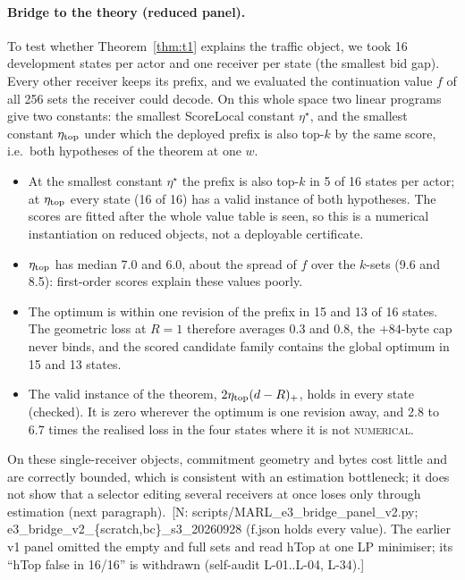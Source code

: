 \documentclass[11pt]{article}
\theoremstyle{definition}
\newcommand{\NUM}{\textsc{numerical}}
\newif\ifshownotes\shownotestrue
\newcommand{\NOTE}[1]{\ifshownotes{\color{notecol}\,\textsf{\footnotesize[N: #1]}}\fi}
\begin{document}
\paragraph{Bridge to the theory (reduced panel).} To test whether Theorem~\ref{thm:t1} explains the
traffic object, we took 16 development states per actor and one receiver per state (the smallest bid
gap). Every other receiver keeps its prefix, and we evaluated the continuation value $f$ of all 256
sets the receiver could decode. On this whole space two linear programs give two constants: the
smallest ScoreLocal constant $\eta^\star$, and the smallest constant $\eta_{\rm top}$ under which the
deployed prefix is also top-$k$ by the same score, i.e.\ both hypotheses of the theorem at one $w$.
\begin{itemize}
\item At the smallest constant $\eta^\star$ the prefix is also top-$k$ in 5 of 16 states per actor; at
  $\eta_{\rm top}$ every state (16 of 16) has a valid instance of both hypotheses. The scores are fitted
  after the whole value table is seen, so this is a numerical instantiation on reduced objects, not a
  deployable certificate.
\item $\eta_{\rm top}$ has median 7.0 and 6.0, about the spread of $f$ over the $k$-sets (9.6 and
  8.5): first-order scores explain these values poorly.
\item The optimum is within one revision of the prefix in 15 and 13 of 16 states. The geometric loss
  at $R=1$ therefore averages 0.3 and 0.8, the $+84$-byte cap never binds, and the scored candidate
  family contains the global optimum in 15 and 13 states.
\item The valid instance of the theorem, $2\eta_{\rm top}(d-R)_+$, holds in every state (checked). It
  is zero wherever the optimum is one revision away, and 2.8 to 6.7 times the realised loss in the four
  states where it is not \NUM.
\end{itemize}
On these single-receiver objects, commitment geometry and bytes cost little and are correctly bounded,
which is consistent with an estimation bottleneck; it does not show that a selector editing several
receivers at once loses only through estimation (next paragraph).
\NOTE{scripts/MARL\_e3\_bridge\_panel\_v2.py; e3\_bridge\_v2\_\{scratch,bc\}\_s3\_20260928 (f.json holds every
value). The earlier v1 panel omitted the empty and full sets and read hTop at one LP minimiser; its
``hTop false in 16/16'' is withdrawn (self-audit L-01..L-04, L-34).}
\end{document}
